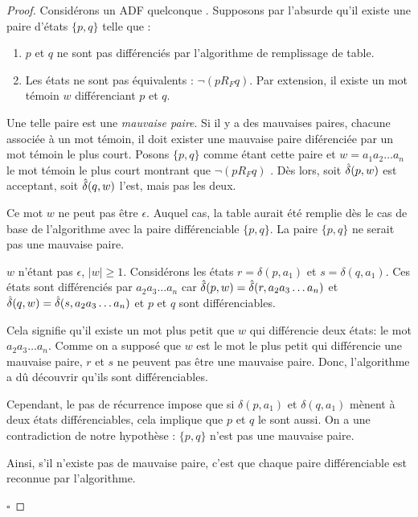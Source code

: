 \begin{proof}

Considérons un ADF quelconque \automaton. Supposons par l'absurde qu'il existe une paire d'états $\{p,q\}$ telle que :
\begin{enumerate}
	 \item $p$ et $q$ ne sont pas différenciés par l'algorithme de remplissage de table.
	 \item Les états ne sont pas équivalents : $\neg (pR_F q)$. Par extension, il existe un mot témoin $w$ différenciant $p$ et $q$.
\end{enumerate}

Une telle paire est une \emph{mauvaise paire}. Si il y a des mauvaises paires, chacune associée à un mot témoin, il doit exister une mauvaise paire diférenciée par un mot témoin le plus court. Posons $\{p,q\}$ comme étant cette paire et $w=a_1a_2\dots a_n$ le mot témoin le plus court montrant que $\neg (pR_F q)$ . Dès lors, soit $\hat{\delta}(p,w)$ est acceptant, soit $\hat{\delta}(q,w)$ l'est, mais pas les deux.

Ce mot $w$ ne peut pas être $\epsilon$. Auquel cas, la table aurait été remplie dès le cas de base de l'algorithme avec la paire différenciable $\{p,q\}$. La paire $\{p,q\}$ ne serait pas une mauvaise paire.

$w$ n'étant pas $\epsilon$, $ |w| \ge 1$. Considérons les états $r = \delta(p,a_1)$ et $s=\delta(q,a_1)$. Ces états sont différenciés par $a_2a_3\dots a_n$ car $\hat{\delta}(p,w) = \hat{\delta}(r, a_2a_3\dots a_n)$ et $\hat{\delta}(q,w) = \hat{\delta}(s, a_2a_3\dots a_n)$ et $p$ et $q$ sont différenciables.

Cela signifie qu'il existe un mot plus petit que $w$ qui différencie deux états: le mot $a_2a_3\dots a_n$. Comme on a supposé que $w$ est le mot le plus petit qui différencie une mauvaise paire, $r$ et $s$ ne peuvent pas être une mauvaise paire. Donc, l'algorithme a dû découvrir qu'ils sont différenciables.

Cependant, le pas de récurrence impose que si $\delta(p, a_1)$ et $\delta(q, a_1)$ mènent à deux états différenciables, cela implique que $p$ et $q$ le sont aussi. On a une contradiction de notre hypothèse : $\{p,q\}$ n'est pas une mauvaise paire.

Ainsi, s'il n'existe pas de mauvaise paire, c'est que chaque paire différenciable est reconnue par l'algorithme.

\hfill$\square$
\end{proof}


